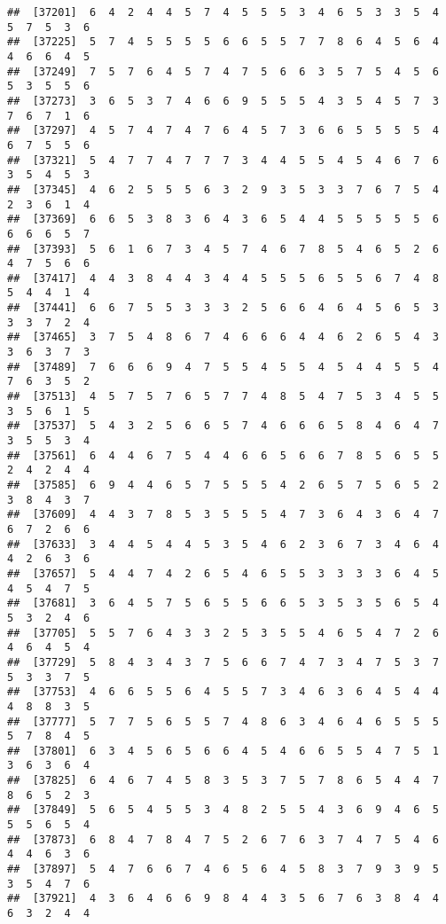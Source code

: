 \documentclass[
]{book}
\begin{document}
\begin{verbatim}
##  [37201]  6  4  2  4  4  5  7  4  5  5  5  3  4  6  5  3  3  5  4  5  7  5  3  6
##  [37225]  5  7  4  5  5  5  5  6  6  5  5  7  7  8  6  4  5  6  4  4  6  6  4  5
##  [37249]  7  5  7  6  4  5  7  4  7  5  6  6  3  5  7  5  4  5  6  5  3  5  5  6
##  [37273]  3  6  5  3  7  4  6  6  9  5  5  5  4  3  5  4  5  7  3  7  6  7  1  6
##  [37297]  4  5  7  4  7  4  7  6  4  5  7  3  6  6  5  5  5  5  4  6  7  5  5  6
##  [37321]  5  4  7  7  4  7  7  7  3  4  4  5  5  4  5  4  6  7  6  3  5  4  5  3
##  [37345]  4  6  2  5  5  5  6  3  2  9  3  5  3  3  7  6  7  5  4  2  3  6  1  4
##  [37369]  6  6  5  3  8  3  6  4  3  6  5  4  4  5  5  5  5  5  6  6  6  6  5  7
##  [37393]  5  6  1  6  7  3  4  5  7  4  6  7  8  5  4  6  5  2  6  4  7  5  6  6
##  [37417]  4  4  3  8  4  4  3  4  4  5  5  5  6  5  5  6  7  4  8  5  4  4  1  4
##  [37441]  6  6  7  5  5  3  3  3  2  5  6  6  4  6  4  5  6  5  3  3  3  7  2  4
##  [37465]  3  7  5  4  8  6  7  4  6  6  6  4  4  6  2  6  5  4  3  3  6  3  7  3
##  [37489]  7  6  6  6  9  4  7  5  5  4  5  5  4  5  4  4  5  5  4  7  6  3  5  2
##  [37513]  4  5  7  5  7  6  5  7  7  4  8  5  4  7  5  3  4  5  5  3  5  6  1  5
##  [37537]  5  4  3  2  5  6  6  5  7  4  6  6  6  5  8  4  6  4  7  3  5  5  3  4
##  [37561]  6  4  4  6  7  5  4  4  6  6  5  6  6  7  8  5  6  5  5  2  4  2  4  4
##  [37585]  6  9  4  4  6  5  7  5  5  5  4  2  6  5  7  5  6  5  2  3  8  4  3  7
##  [37609]  4  4  3  7  8  5  3  5  5  5  4  7  3  6  4  3  6  4  7  6  7  2  6  6
##  [37633]  3  4  4  5  4  4  5  3  5  4  6  2  3  6  7  3  4  6  4  4  2  6  3  6
##  [37657]  5  4  4  7  4  2  6  5  4  6  5  5  3  3  3  3  6  4  5  4  5  4  7  5
##  [37681]  3  6  4  5  7  5  6  5  5  6  6  5  3  5  3  5  6  5  4  5  3  2  4  6
##  [37705]  5  5  7  6  4  3  3  2  5  3  5  5  4  6  5  4  7  2  6  4  6  4  5  4
##  [37729]  5  8  4  3  4  3  7  5  6  6  7  4  7  3  4  7  5  3  7  5  3  3  7  5
##  [37753]  4  6  6  5  5  6  4  5  5  7  3  4  6  3  6  4  5  4  4  4  8  8  3  5
##  [37777]  5  7  7  5  6  5  5  7  4  8  6  3  4  6  4  6  5  5  5  5  7  8  4  5
##  [37801]  6  3  4  5  6  5  6  6  4  5  4  6  6  5  5  4  7  5  1  3  6  3  6  4
##  [37825]  6  4  6  7  4  5  8  3  5  3  7  5  7  8  6  5  4  4  7  8  6  5  2  3
##  [37849]  5  6  5  4  5  5  3  4  8  2  5  5  4  3  6  9  4  6  5  5  5  6  5  4
##  [37873]  6  8  4  7  8  4  7  5  2  6  7  6  3  7  4  7  5  4  6  4  4  6  3  6
##  [37897]  5  4  7  6  6  7  4  6  5  6  4  5  8  3  7  9  3  9  5  3  5  4  7  6
##  [37921]  4  3  6  4  6  6  9  8  4  4  3  5  6  7  6  3  8  4  4  6  3  2  4  4

\end{verbatim}
\end{document}
